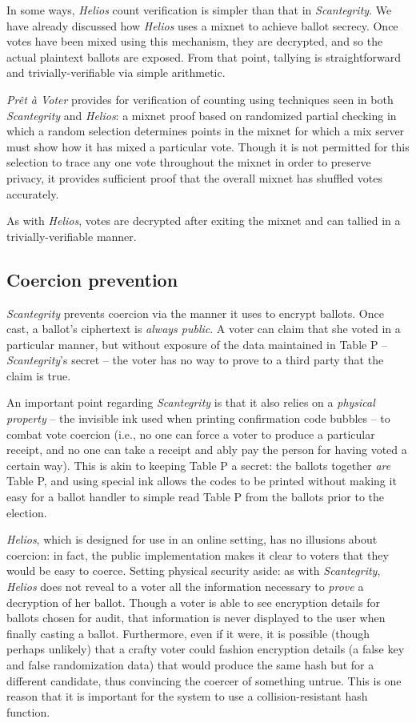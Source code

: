 \documentclass[10pt,twocolumn]{article}
\newcommand{\term}[1]{\textit{#1}}
\newcommand{\preta}{Pr\^{e}t \`{a}}
\newcommand{\pv}{\preta{} Voter}
\begin{document}
In some ways, \term{Helios} count verification is simpler than that in \term{Scantegrity}. We have already
discussed how \term{Helios} uses a mixnet to achieve ballot secrecy. Once votes have been mixed using this
mechanism, they are decrypted, and so the actual plaintext ballots are exposed. From that point,
tallying is straightforward and trivially-verifiable via simple arithmetic.

\term{\pv{}} provides for verification of counting using techniques seen in both \term{Scantegrity}
and \term{Helios}: a mixnet proof based on randomized partial checking in which a random selection
determines points in the mixnet for which a mix server must show how it has mixed a particular vote.
Though it is not permitted for this selection to trace any one vote throughout the mixnet in order
to preserve privacy, it provides sufficient proof that the overall mixnet has shuffled votes
accurately.

As with \term{Helios}, votes are decrypted after exiting the mixnet and can tallied in a
trivially-verifiable manner.

\subsection{Coercion prevention}

\term{Scantegrity} prevents coercion via the manner it uses to encrypt ballots. Once cast, a ballot's
ciphertext is \emph{always public}. A voter can claim that she voted in a particular manner, but
without exposure of the data maintained in Table P -- \term{Scantegrity}'s secret -- the voter has no
way to prove to a third party that the claim is true.

An important point regarding \term{Scantegrity} is that it also relies on a \emph{physical property} -- the
invisible ink used when printing confirmation code bubbles -- to combat vote coercion (i.e., no
one can force a voter to produce a particular receipt, and no one can take a receipt and ably pay
the person for having voted a certain way). This is akin to keeping Table P a secret: the ballots
together \emph{are} Table P, and using special ink allows the codes to be printed without making it
easy for a ballot handler to simple read Table P from the ballots prior to the election.

\term{Helios}, which is designed for use in an online setting, has no illusions about coercion: in fact,
the public implementation makes it clear to voters that they would be easy to coerce. Setting
physical security aside: as with \term{Scantegrity}, \term{Helios} does not reveal to a voter all the
information necessary to \emph{prove} a decryption of her ballot. Though a voter is able to see
encryption details for ballots chosen for audit, that information is never displayed to the user
when finally casting a ballot. Furthermore, even if it were, it is possible (though perhaps
unlikely) that a crafty voter could fashion encryption details (a false key and false randomization
data) that would produce the same hash but for a different candidate, thus convincing the coercer
of something untrue.
This is one reason that it is important for the system to use a collision-resistant hash function.
\end{document}

